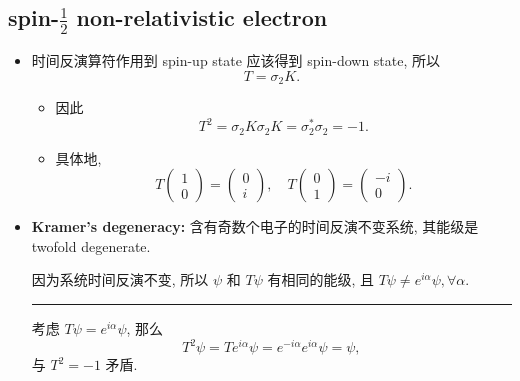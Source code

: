 \subsection{spin-\texorpdfstring{$\frac{1}{2}$}{1/2} non-relativistic electron}
\begin{itemize}
	\item 时间反演算符作用到 spin-up state 应该得到 spin-down state, 所以
	\begin{equation}
		T = \sigma_2 K.
	\end{equation}
	\begin{itemize}
		\item 因此
		\begin{equation}
			T^2 = \sigma_2 K \sigma_2 K = \sigma_2^* \sigma_2 = - 1.
		\end{equation}
		
		\item 具体地,
		\begin{equation}
			T \begin{pmatrix}
				1 \\
				0
			\end{pmatrix} = \begin{pmatrix}
				0 \\
				i
			\end{pmatrix}, \quad T \begin{pmatrix}
				0 \\
				1
			\end{pmatrix} = \begin{pmatrix}
				- i \\
				0
			\end{pmatrix}.
		\end{equation}
	\end{itemize}
	
	\item \textbf{Kramer's degeneracy:} 含有奇数个电子的时间反演不变系统, 其能级是 twofold degenerate.
	
	\begin{tcolorbox}[title=proof:]
		因为系统时间反演不变, 所以 $\psi$ 和 $T \psi$ 有相同的能级, 且 $T \psi \neq e^{i \alpha} \psi, \forall \alpha$.
		
		\noindent\rule[0.5ex]{\linewidth}{0.5pt} %
		
		考虑 $T \psi = e^{i \alpha} \psi$, 那么
		\begin{equation}
			T^2 \psi = T e^{i \alpha} \psi = e^{- i \alpha} e^{i \alpha} \psi = \psi,
		\end{equation}
		与 $T^2 = - 1$ 矛盾.
	\end{tcolorbox}
\end{itemize}
